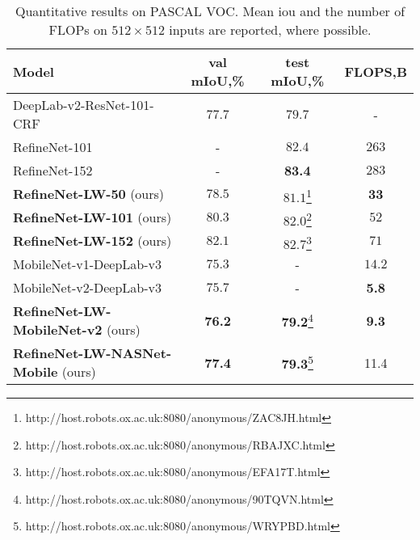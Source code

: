 \documentclass{bmvc2k}
\begin{document}
\begin{table}
	\begin{center}
		\begin{tabular}{l|c|c|c}
			\hline Model & val mIoU,\% & test mIoU,\% & FLOPS,B\\
\hline
DeepLab-v2-ResNet-101-CRF~\cite{ChenPK0Y16} & $77.7$ & $79.7$ & -\\
			RefineNet-101~\cite{LinMSR17} & - & $82.4$ & $263$\\
			RefineNet-152~\cite{LinMSR17} & -  & \textbf{83.4} & $283$\\
			\textbf{RefineNet-LW-50} (ours) & $78.5$ & $81.1$\footnote{http://host.robots.ox.ac.uk:8080/anonymous/ZAC8JH.html} & \textbf{33}\\
			\textbf{RefineNet-LW-101} (ours) & $80.3$ & $82.0$\footnote{http://host.robots.ox.ac.uk:8080/anonymous/RBAJXC.html} & $52$\\
			\textbf{RefineNet-LW-152} (ours) & $82.1$ & $82.7$\footnote{http://host.robots.ox.ac.uk:8080/anonymous/EFA17T.html} & $71$\\
			\hline
			MobileNet-v1-DeepLab-v3~\cite{abs-1801-04381}  & $75.3$ & - & $14.2$\\
			MobileNet-v2-DeepLab-v3~\cite{abs-1801-04381}  & $75.7$ & - & \textbf{5.8}\\
			\textbf{RefineNet-LW-MobileNet-v2} (ours) & \textbf{76.2} & \textbf{79.2}\footnote{http://host.robots.ox.ac.uk:8080/anonymous/90TQVN.html} & \textbf{9.3}\\
			\textbf{RefineNet-LW-NASNet-Mobile} (ours) & \textbf{77.4} & \textbf{79.3}\footnote{http://host.robots.ox.ac.uk:8080/anonymous/WRYPBD.html} & 11.4\\
			\hline
		\end{tabular}
	\end{center}
	\caption{Quantitative results on PASCAL VOC. Mean iou and the number of FLOPs on $512\times512$ inputs are reported, where possible.\label{table:voc}}
	\vskip -0.15in
\end{table}
\end{document}
